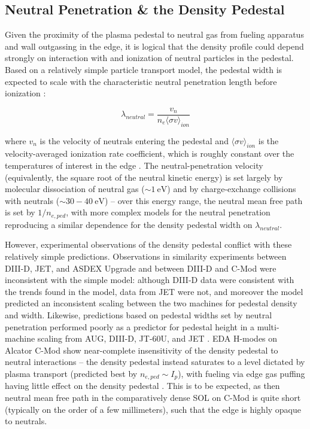 \subsection{Neutral Penetration \& the Density Pedestal}\label{subsec:mod_neutral}

Given the proximity of the plasma pedestal to neutral gas from fueling apparatus and wall outgassing in the edge, it is logical that the density profile could depend strongly on interaction with and ionization of neutral particles in the pedestal.  Based on a relatively simple particle transport model, the pedestal width is expected to scale with the characteristic neutral penetration length before ionization \cite{Hughes2005,Mahdavi2002}:

\begin{equation}\label{eq:neutralpenetration}
 \lambda_{neutral} = \frac{v_n}{n_e \langle \sigma v \rangle_{ion}}
\end{equation}

\noindent where $v_n$ is the velocity of neutrals entering the pedestal and $\langle \sigma v \rangle_{ion}$ is the velocity-averaged ionization rate coefficient, which is roughly constant over the temperatures of interest in the edge \cite{Hughes2005}.  The neutral-penetration velocity (equivalently, the square root of the neutral kinetic energy) is set largely by molecular dissociation of neutral gas ($\sim \SI{1}{\electronvolt}$) and by charge-exchange collisions with neutrals ($\sim 30-\SI{40}{\electronvolt}$) -- over this energy range, the neutral mean free path is set by $1/n_{e,ped}$, with more complex models for the neutral penetration reproducing a similar dependence for the density pedestal width on $\lambda_{neutral}$.

However, experimental observations of the density pedestal conflict with these relatively simple predictions.    Observations in similarity experiments between DIII-D, JET, and ASDEX Upgrade \cite{Beurskens2011} and between DIII-D and C-Mod \cite{Mossessian2003} were inconsistent with the simple model: although DIII-D data were consistent with the trends found in the model, data from JET were not, and moreover the model predicted an inconsistent scaling between the two machines for pedestal density and width.  Likewise, predictions based on pedestal widths set by neutral penetration performed poorly as a predictor for pedestal height in a multi-machine scaling from AUG, DIII-D, JT-60U, and JET \cite{Onjun2002}.  EDA H-modes on Alcator C-Mod show near-complete insensitivity of the density pedestal to neutral interactions -- the density pedestal instead saturates to a level dictated by plasma transport (predicted best by $n_{e,ped} \sim I_p$), with fueling via edge gas puffing having little effect on the density pedestal \cite{Hughes2006,Hughes2007}.  This is to be expected, as then neutral mean free path in the comparatively dense SOL on C-Mod is quite short (typically on the order of a few millimeters), such that the edge is highly opaque to neutrals.


